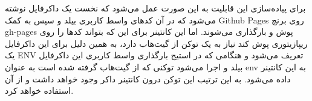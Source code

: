 برای پیاده‌سازی این قابلیت به این صورت عمل می‌شود که نخست یک داکرفایل نوشته می‌شود که در آن کدهای واسط کاربری بیلد و سپس به کمک
\gls{Github Pages}
روی برنچ gh-pages پوش و بارگذاری می‌شوند. اما این کانتینر برای این که بتواند کدها را روی ریپازیتوری پوش کند نیاز به یک توکن از گیت‌هاب دارد، به همین دلیل برای این داکرفایل یک ENV تعریف می‌شود و هنگامی که در استیج بارگذاری واسط کاربری این داکرفایل بیلد و اجرا می‌شود توکنی که از گیت‌هاب گرفته شده است به عنوان env به این کانتینر داده می‌شود. به این ترتیب این توکن درون کانتینر داکر وجود خواهد داشت و
از آن استفاده خواهد کرد.

